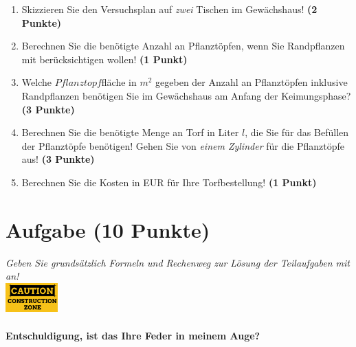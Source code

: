 \documentclass[a4paper, 9pt]{scrartcl}\usepackage[]{graphicx}\usepackage[]{xcolor}
\begin{document}
\begin{enumerate}
\item Skizzieren Sie den Versuchsplan auf \textit{zwei} Tischen im
  Gew{\"a}chshaus! \textbf{(2 Punkte)}
\item Berechnen Sie die ben{\"o}tigte Anzahl an Pflanzt{\"o}pfen, wenn Sie
  Randpflanzen mit ber{\"u}cksichtigen wollen! \textbf{(1 Punkt)}
\item Welche $Pflanztopf$fl{\"a}che in $m^2$ gegeben der Anzahl an
  Pflanzt{\"o}pfen inklusive Randpflanzen ben{\"o}tigen Sie im Gew{\"a}chshaus am
  Anfang der Keimungsphase?  \textbf{(3 Punkte)}
\item Berechnen Sie die ben{\"o}tigte Menge an Torf in Liter $l$, die Sie f{\"u}r
  das Bef{\"u}llen der Pflanzt{\"o}pfe ben{\"o}tigen! Gehen Sie von \textit{einem
    Zylinder} f{\"u}r die Pflanzt{\"o}pfe aus!  \textbf{(3 Punkte)}
\item Berechnen Sie die Kosten in EUR f{\"u}r Ihre Torfbestellung! \textbf{(1
    Punkt)}
\end{enumerate}



 
\clearpage

\section{Aufgabe \hfill (10 Punkte)}

\textit{Geben Sie grunds{\"a}tzlich Formeln und Rechenweg zur L{\"o}sung der
  Teilaufgaben mit an!} \\[1Ex]

\hfill\href{}{\includegraphics[width = 2cm]{img/caution}} %
\hspace{2Ex}

\paragraph{Entschuldigung,  ist das Ihre Feder in meinem Auge?}
\end{document}
